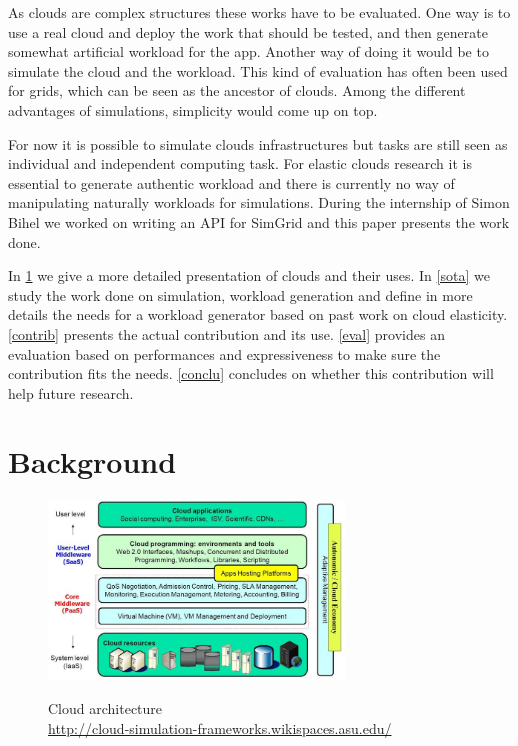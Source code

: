 \documentclass[a4paper, onecolumn]{article}
\begin{document}
  As clouds are complex structures these works have to be evaluated. One way is
  to use a real cloud and deploy the work that should be tested, and then
  generate somewhat artificial workload for the app. Another way of doing it
  would be to simulate the cloud and the workload. This kind of evaluation has
  often been used for grids, which can be seen as the ancestor of clouds. Among
  the different advantages of simulations, simplicity would come up on top.
  
  For now it is possible to simulate clouds infrastructures but tasks are still 
  seen as individual and independent computing task. For elastic clouds 
  research it is essential to generate authentic workload and there is 
  currently no way of manipulating naturally workloads for simulations. During 
  the internship of Simon Bihel we worked on writing an API for SimGrid and this
  paper presents the work done.
  
  In \ref{background} we give a more detailed presentation of clouds and their 
  uses. In \ref{sota} we study the work done on simulation, workload generation 
  and define in more details the needs for a workload generator based on past 
  work on cloud elasticity. \ref{contrib} presents the actual contribution and 
  its use. \ref{eval} provides an evaluation based on performances and 
  expressiveness to make sure the contribution fits the needs. \ref{conclu} 
  concludes on whether this contribution will help future research.


\section{Background} \label{background}
  \begin{figure}
    \caption{Cloud architecture \\ 
    \url{http://cloud-simulation-frameworks.wikispaces.asu.edu/}}
    \centering
    \includegraphics[width=0.7\textwidth]{../plots/cloud_architecture}
    \label{cloud_arch}
  \end{figure}
  
\end{document}

